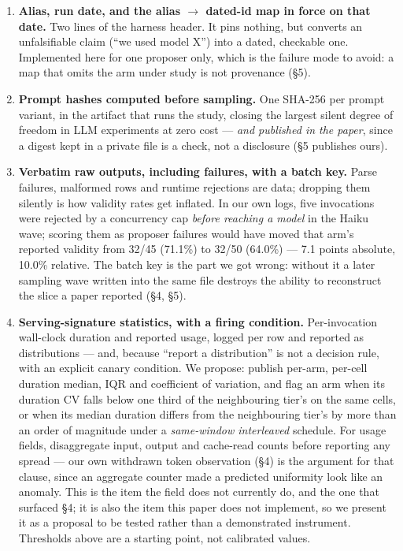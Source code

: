 \documentclass[11pt]{article}
\begin{document}
\begin{enumerate}
\item \textbf{Alias, run date, and the alias $\rightarrow$ dated-id map in force on that date.} Two lines
of the harness header. It pins nothing, but converts an unfalsifiable claim (``we
used model X'') into a dated, checkable one. Implemented here for one proposer only,
which is the failure mode to avoid: a map that omits the arm under study is not
provenance (\S5).

\item \textbf{Prompt hashes computed before sampling.} One SHA-256 per prompt variant, in the
artifact that runs the study, closing the largest silent degree of freedom in LLM
experiments at zero cost --- \emph{and published in the paper}, since a digest kept in a
private file is a check, not a disclosure (\S5 publishes ours).

\item \textbf{Verbatim raw outputs, including failures, with a batch key.} Parse failures,
malformed rows and runtime rejections are data; dropping them silently is how validity
rates get inflated. In our own logs, five invocations were rejected by a concurrency cap
\emph{before reaching a model} in the Haiku wave; scoring them as proposer failures would have
moved that arm's reported validity from 32/45 (71.1\%) to 32/50 (64.0\%) --- 7.1 points
absolute, 10.0\% relative. The batch key is the part we got wrong: without it a later
sampling wave written into the same file destroys the ability to reconstruct the slice a
paper reported (\S4, \S5).

\item \textbf{Serving-signature statistics, with a firing condition.} Per-invocation wall-clock
duration and reported usage, logged per row and reported as distributions --- and, because
``report a distribution'' is not a decision rule, with an explicit canary condition. We
propose: publish per-arm, per-cell duration median, IQR and coefficient of variation,
and flag an arm when its duration CV falls below one third of the neighbouring tier's on
the same cells, or when its median duration differs from the neighbouring tier's by more
than an order of magnitude under a \emph{same-window interleaved} schedule. For usage fields,
disaggregate input, output and cache-read counts before reporting any spread --- our own
withdrawn token observation (\S4) is the argument for that clause, since an aggregate
counter made a predicted uniformity look like an anomaly. This is the item the field does
not currently do, and the one that surfaced \S4; it is also the item this paper does not
implement, so we present it as a proposal to be tested rather than a demonstrated
instrument. Thresholds above are a starting point, not calibrated values.
\end{enumerate}
\end{document}
